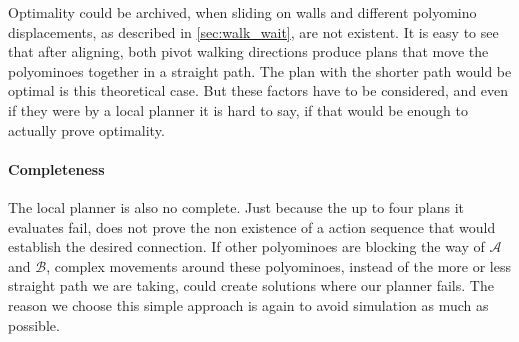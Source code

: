 Optimality could be archived, when sliding on walls and different polyomino displacements, as described in \autoref{sec:walk_wait}, are not existent.
It is easy to see that after aligning, both pivot walking directions produce plans that move the polyominoes together in a straight path.
The plan with the shorter path would be optimal is this theoretical case.
But these factors have to be considered, and even if they were by a local planner it is hard to say, if that would be enough to actually prove optimality.

\paragraph{Completeness}

The local planner is also no complete.
Just because the up to four plans it evaluates fail, does not prove the non existence of a action sequence that would establish the desired connection.
If other polyominoes are blocking the way of $\mathcal{A}$ and $\mathcal{B}$, complex movements around these polyominoes, instead of the more or less straight path we are taking, could create solutions where our planner fails.
The reason we choose this simple approach is again to avoid simulation as much as possible. 








